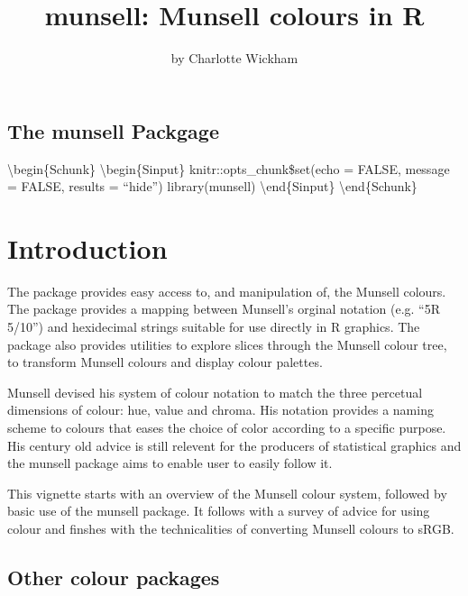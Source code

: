 \title{munsell: Munsell colours in R}
\author{by Charlotte Wickham}

\maketitle


\subsection{The munsell Packgage}\label{the-munsell-packgage}

\textbackslash{}begin\{Schunk\} \textbackslash{}begin\{Sinput\}
knitr::opts\_chunk\$set(echo = FALSE, message = FALSE, results =
``hide'') library(munsell) \textbackslash{}end\{Sinput\}
\textbackslash{}end\{Schunk\}

\section{Introduction}\label{introduction}

The  package provides easy access to, and manipulation
of, the Munsell colours. The  package provides a mapping
between Munsell's orginal notation (e.g. ``5R 5/10'') and hexidecimal
strings suitable for use directly in R graphics. The package also
provides utilities to explore slices through the Munsell colour tree, to
transform Munsell colours and display colour palettes.

Munsell devised his system of colour notation to match the three
percetual dimensions of colour: hue, value and chroma. His notation
provides a naming scheme to colours that eases the choice of color
according to a specific purpose. His century old advice is still
relevent for the producers of statistical graphics and the munsell
package aims to enable user to easily follow it.

This vignette starts with an overview of the Munsell colour system,
followed by basic use of the munsell package. It follows with a survey
of advice for using colour and finshes with the technicalities of
converting Munsell colours to sRGB.

\subsection{Other colour packages}\label{other-colour-packages}

